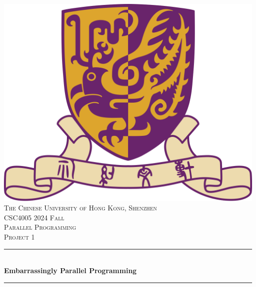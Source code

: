 \documentclass[12pt,a4paper]{report}
\begin{document}
\begin{titlepage}

    \newcommand{\HRule}{\rule{\linewidth}{0.5mm}}

    \center
    \vspace*{1.5cm}


    \includegraphics[scale=.2]{src/cuhk.png}\\[1cm]
    \textsc{\large The Chinese University of Hong Kong, Shenzhen}\\[1.5cm]

    \textsc{\Large CSC4005 2024 Fall}\\[0.5cm]

    \textsc{\large Parallel Programming}\\[0.5cm]

    \textsc{\large Project 1}\\[0.5cm]


    \HRule \\[0.4cm]
    { \huge \bfseries Embarrassingly Parallel Programming}
    \HRule \\[1.5cm]


\end{titlepage}
\end{document}
